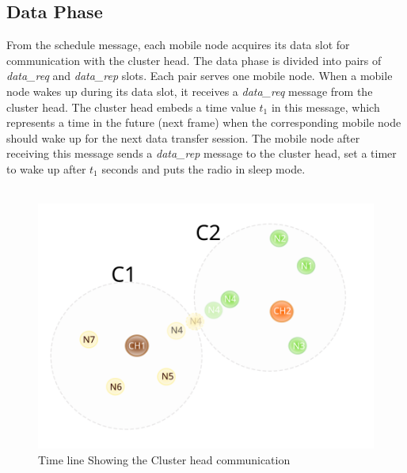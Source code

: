 \documentclass[a4paper, conference, 10pt]{IEEEtran}
\begin{document}
\subsection{Data Phase}
\label{data_phase}

From the schedule message, each mobile node acquires its data slot for communication with the cluster head. The data phase is divided into pairs of \emph{data\_req} and \emph{data\_rep} slots. Each pair serves one mobile node. When a mobile node wakes up during its data slot, it receives a \emph{data\_req} message from the cluster head. The cluster head embeds a time value \emph{$t_1$} in this message, which represents a time in the future (next frame) when the corresponding mobile node should wake up for the next data transfer session. The mobile node after receiving this message sends a \emph{data\_rep} message to the cluster head, set a timer to wake up after \emph{$t_1$} seconds and puts the radio in sleep mode. \\\\

\begin{figure}[h]{} %
	\label{fig:scenario}
  \begin{center}
    \includegraphics[scale=0.6, natwidth=0.38\textwidth]{scenario01}
  \end{center}
  \caption{Time line Showing the Cluster head communication}
\end{figure}
\end{document}
